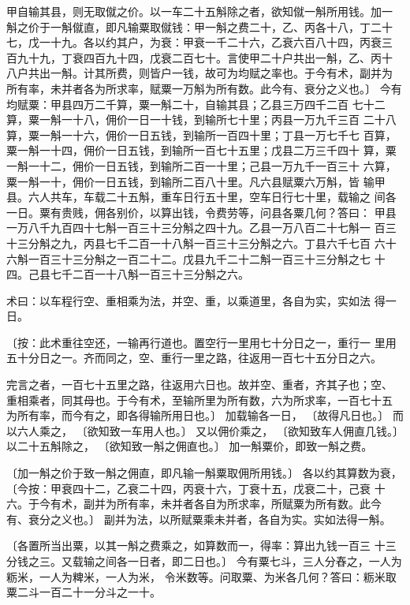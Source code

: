 \documentclass[a4paper,12pt,UTF8,twoside]{ctexbook}
\begin{document}
甲自输其县，则无取僦之价。以一车二十五斛除之者，欲知僦一斛所用钱。加一 斛之价于一斛僦直，即凡输粟取僦钱：甲一斛之费二十，乙、丙各十八，丁二十 七，戊一十九。各以约其户，为衰：甲衰一千二十六，乙衰六百八十四，丙衰三 百九十九，丁衰四百九十四，戊衰二百七十。言使甲二十户共出一斛，乙、丙十 八户共出一斛。计其所费，则皆户一钱，故可为均赋之率也。于今有术，副并为 所有率，未并者各为所求率，赋粟一万斛为所有数。此今有、衰分之义也。〕 今有均赋粟：甲县四万二千算，粟一斛二十，自输其县；乙县三万四千二百 七十二算，粟一斛一十八，佣价一日一十钱，到输所七十里；丙县一万九千三百 二十八算，粟一斛一十六，佣价一日五钱，到输所一百四十里；丁县一万七千七 百算，粟一斛一十四，佣价一日五钱，到输所一百七十五里；戊县二万三千四十 算，粟一斛一十二，佣价一日五钱，到输所二百一十里；己县一万九千一百三十 六算，粟一斛一十，佣价一日五钱，到输所二百八十里。凡六县赋粟六万斛，皆 输甲县。六人共车，车载二十五斛，重车日行五十里，空车日行七十里，载输之 间各一日。粟有贵贱，佣各别价，以算出钱，令费劳等，问县各粟几何？答曰： 甲县一万八千九百四十七斛一百三十三分斛之四十九。乙县一万八百二十七斛一 百三十三分斛之九，丙县七千二百一十八斛一百三十三分斛之六。丁县六千七百 六十六斛一百三十三分斛之一百二十二。戊县九千二十二斛一百三十三分斛之七 十四。己县七千二百一十八斛一百三十三分斛之六。

术曰：以车程行空、重相乘为法，并空、重，以乘道里，各自为实，实如法 得一日。

〔按：此术重往空还，一输再行道也。置空行一里用七十分日之一，重行一 里用五十分日之一。齐而同之，空、重行一里之路，往返用一百七十五分日之六。

完言之者，一百七十五里之路，往返用六日也。故并空、重者，齐其子也；空、 重相乘者，同其母也。于今有术，至输所里为所有数，六为所求率，一百七十五 为所有率，而今有之，即各得输所用日也。〕 加载输各一日， 〔故得凡日也。〕 而以六人乘之， 〔欲知致一车用人也。〕 又以佣价乘之， 〔欲知致车人佣直几钱。〕 以二十五斛除之， 〔欲知致一斛之佣直也。〕 加一斛粟价，即致一斛之费。

〔加一斛之价于致一斛之佣直，即凡输一斛粟取佣所用钱。〕 各以约其算数为衰， 〔今按：甲衰四十二，乙衰二十四，丙衰十六，丁衰十五，戊衰二十，己衰 十六。于今有术，副并为所有率，未并者各自为所求率，所赋粟为所有数。此今 有、衰分之义也。〕 副并为法，以所赋粟乘未并者，各自为实。实如法得一斛。

〔各置所当出粟，以其一斛之费乘之，如算数而一，得率：算出九钱一百三 十三分钱之三。又载输之间各一日者，即二日也。〕 今有粟七斗，三人分舂之，一人为粝米，一人为粺米，一人为米， 令米数等。问取粟、为米各几何？答曰：粝米取粟二斗一百二十一分斗之一十。
\end{document}
